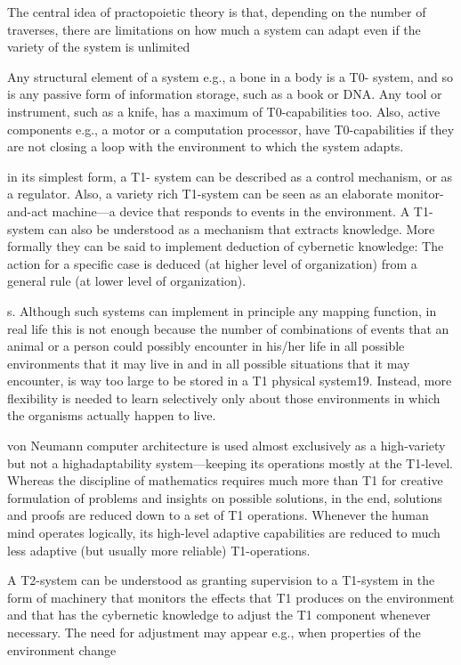 \documentclass[10pt,a4paper]{article}
\begin{document}
The central idea of practopoietic theory is that, depending on the
number of traverses, there are limitations on how much a system can
adapt even if the variety of the system is unlimited

Any structural element of a system e.g., a bone in a body is a T0-
system, and so is any passive form of information storage, such as a
book or DNA. Any tool or instrument, such as a knife, has a maximum
of T0-capabilities too. Also, active components e.g., a motor or a
computation processor, have T0-capabilities if they are not closing a
loop with the environment to which the system adapts.


in its simplest form, a T1-
system can be described as a control mechanism, or as a regulator. Also,
a variety rich T1-system can be seen as an elaborate monitor-and-act
machine—a device that responds to events in the environment.
A T1-system can also be understood as a mechanism that
extracts knowledge. More formally they can be said to implement
deduction of cybernetic knowledge: The action for a specific case is
deduced (at higher level of organization) from a general rule (at
lower level of organization).

s. Although such systems can
implement in principle any mapping function, in real life this is not
enough because the number of combinations of events that an animal
or a person could possibly encounter in his/her life in all possible
environments that it may live in and in all possible situations that it
may encounter, is way too large to be stored in a T1 physical system19.
Instead, more flexibility is needed to learn selectively only about those
environments in which the organisms actually happen to live.

von Neumann
computer architecture is used almost exclusively as a high-variety but not a highadaptability
system—keeping its operations mostly at the T1-level. 
Whereas the discipline of mathematics requires much more
than T1 for creative formulation of problems and insights on possible solutions, in
the end, solutions and proofs are reduced down to a set of T1 operations. Whenever
the human mind operates logically, its high-level adaptive capabilities are reduced
to much less adaptive (but usually more reliable) T1-operations. 

A T2-system can be
understood as granting supervision to a T1-system in the form of
machinery that monitors the effects that T1 produces on the
environment and that has the cybernetic knowledge to adjust
the T1 component whenever necessary. The need for adjustment
may appear e.g., when properties of the environment change
\end{document}
